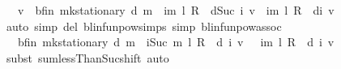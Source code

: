 \begin{isabellebody}
\ {\isachardoublequoteopen}{\isasymdots}\ {\isacharequal}{\kern0pt}\ v\ {\isacharplus}{\kern0pt}\ {\isasymnu}\isactrlsub b{\isacharunderscore}{\kern0pt}fin\ {\isacharparenleft}{\kern0pt}mk{\isacharunderscore}{\kern0pt}stationary\ d{\isacharparenright}{\kern0pt}\ m\ {\isacharplus}{\kern0pt}\ {\isacharparenleft}{\kern0pt}{\isasymSum}i{\isacharless}{\kern0pt}m{\isachardot}{\kern0pt}\ {\isacharparenleft}{\kern0pt}{\isacharparenleft}{\kern0pt}l\ {\isacharasterisk}{\kern0pt}\isactrlsub R\ {\isasymP}\ d{\isacharparenright}{\kern0pt}{\isacharcircum}{\kern0pt}{\isacharcircum}{\kern0pt}Suc\ i{\isacharparenright}{\kern0pt}\ v{\isacharparenright}{\kern0pt}\ {\isacharminus}{\kern0pt}\ {\isacharparenleft}{\kern0pt}{\isasymSum}i{\isacharless}{\kern0pt}m{\isachardot}{\kern0pt}\ {\isacharparenleft}{\kern0pt}l\ {\isacharasterisk}{\kern0pt}\isactrlsub R\ {\isasymP}\ d{\isacharparenright}{\kern0pt}{\isacharcircum}{\kern0pt}{\isacharcircum}{\kern0pt}i{\isacharparenright}{\kern0pt}\ v{\isachardoublequoteclose}\isanewline
\ \ \ \ \isamarkupfalse%
\ {\isacharparenleft}{\kern0pt}auto\ simp\ del{\isacharcolon}{\kern0pt}\ blinfunpow{\isachardot}{\kern0pt}simps\ simp{\isacharcolon}{\kern0pt}\ blinfunpow{\isacharunderscore}{\kern0pt}assoc{\isacharparenright}{\kern0pt}\isanewline
\ \ \isamarkupfalse%
\ \isamarkupfalse%
\ {\isachardoublequoteopen}{\isasymdots}\ {\isacharequal}{\kern0pt}\ {\isasymnu}\isactrlsub b{\isacharunderscore}{\kern0pt}fin\ {\isacharparenleft}{\kern0pt}mk{\isacharunderscore}{\kern0pt}stationary\ d{\isacharparenright}{\kern0pt}\ m\ {\isacharplus}{\kern0pt}\ {\isacharparenleft}{\kern0pt}{\isasymSum}i{\isacharless}{\kern0pt}Suc\ m{\isachardot}{\kern0pt}\ {\isacharparenleft}{\kern0pt}{\isacharparenleft}{\kern0pt}l\ {\isacharasterisk}{\kern0pt}\isactrlsub R\ {\isasymP}\ d{\isacharparenright}{\kern0pt}{\isacharcircum}{\kern0pt}{\isacharcircum}{\kern0pt}\ i{\isacharparenright}{\kern0pt}\ v{\isacharparenright}{\kern0pt}\ \ {\isacharminus}{\kern0pt}\ {\isacharparenleft}{\kern0pt}{\isasymSum}i{\isacharless}{\kern0pt}m{\isachardot}{\kern0pt}\ {\isacharparenleft}{\kern0pt}l\ {\isacharasterisk}{\kern0pt}\isactrlsub R\ {\isasymP}\ d{\isacharparenright}{\kern0pt}{\isacharcircum}{\kern0pt}{\isacharcircum}{\kern0pt}\ i{\isacharparenright}{\kern0pt}\ v{\isachardoublequoteclose}\isanewline
\ \ \ \ \isamarkupfalse%
\ {\isacharparenleft}{\kern0pt}subst\ sum{\isachardot}{\kern0pt}lessThan{\isacharunderscore}{\kern0pt}Suc{\isacharunderscore}{\kern0pt}shift{\isacharparenright}{\kern0pt}\ auto\isanewline

\end{isabellebody}
